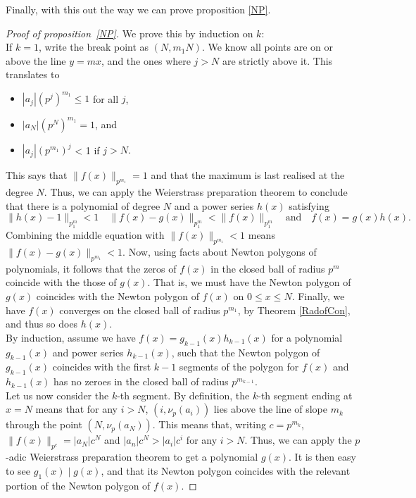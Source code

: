 Finally, with this out the way we can prove proposition \ref{NP}.

\begin{proof}[Proof of proposition~\ref{NP}]
    We prove this by induction on $k$:\\
    If $k=1$, write the break point as $(N, m_1N)$. We know all points are on or above the line
    $y = m x$, and the ones where $j > N$ are strictly above it. This translates to
    \begin{itemize}
        \item $|a_j | (p^j)^{m_1} \leq 1$ for all $j$,
        \item $|a_N | (p^N)^{m_1} = 1$, and
        \item $|a_j | (p^{m_1})^j$ < 1 if $j > N.$
    \end{itemize}
    This says that $\|f(x) \|_{p^{m_1}} = 1$ and that the maximum is last realised at the degree
    $N$. Thus, we can apply the Weierstrass preparation theorem to conclude that there is a
    polynomial of degree $N$ and a power series $h(x)$ satisfying
    \[
    \| h(x) - 1 \|_{p^m_1} < 1 \quad \|f(x) - g(x)\|_{p^m_1} < \|f(x) \|_{p^m_1} \quad \text{and} \quad f(x) = g(x) h(x).
    \]
    Combining the middle equation with $\| f(x) \|_{p^{m_1}} < 1$ means
    $\| f(x) - g(x) \|_{p^{m_1}} < 1$.
    Now, using facts about Newton polygons of polynomials, it follows that the zeros of $f(x)$ in
    the closed ball of radius $p^m$ coincide with the those of $g(x)$. That is, we must have the
    Newton polygon of $g(x)$ coincides with the Newton polygon of $f(x)$ on $0 \leq x \leq N$.
    Finally, we have $f(x)$ converges on the closed ball of radius $p^{m_1}$, by Theorem
    \ref{RadofCon}, and thus so does $h(x).$
    \\
    By induction, assume we have $f(x) = g_{k-1}(x)h_{k-1}(x)$ for a polynomial $g_{k-1}(x)$ and
    power series $h_{k-1}(x)$, such that the Newton polygon of $g_{k-1}(x)$ coincides with the
    first $k-1$ segments of the polygon for $f(x)$ and $h_{k-1}(x)$ has no zeroes in the closed ball
    of radius $p^{m_{k-1}}$.
    \\
    Let us now consider the $k$-th segment. By definition, the $k$-th segment ending at $x = N$
    means that for any $i > N$, $(i, \nu_p (a_i))$ lies above the line of slope $m_k$ through the
    point $(N, \nu_p (a_N))$. This means that, writing $c = p^{m_k}$, $\| f(x) \|_{p^{c}} =
    \lvert a_N \rvert c^N$ and $\lvert a_n \rvert c^N > \lvert a_i \rvert c^i $ for any $i > N$.
    Thus, we can apply the $p$-adic Weierstrass preparation theorem to get a polynomial $g(x)$.
    It is then easy to see $g_1 (x) \mid g(x)$, and that its Newton polygon coincides with the
    relevant portion of the Newton polygon of $f(x).$
\end{proof}
